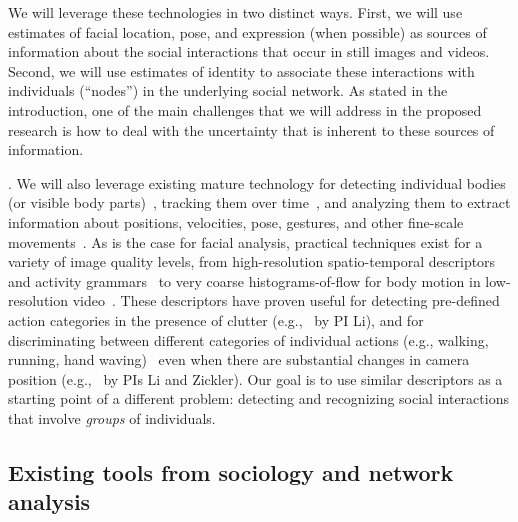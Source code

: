 We will leverage these technologies in two distinct ways. First, we will use estimates of facial location, pose, and expression (when possible) as sources of information about the social interactions that occur in still images and videos. Second, we will use estimates of identity to associate these interactions with individuals (``nodes'') in the underlying social network. As stated in the introduction, one of the main challenges that we will address  in the proposed research is how to deal with the uncertainty that is inherent to these sources of information. 

. We will also leverage existing mature technology for detecting individual bodies (or visible body parts)~\cite{Dalal:HOG}, tracking them over time~\cite{}, and analyzing them to extract information about positions, velocities, pose, gestures, and other fine-scale movements~\cite{Mitra:gesture,Ryoo:action,Poppe}. As is the case for facial analysis, practical techniques exist for a variety of image quality levels, from high-resolution spatio-temporal descriptors~\cite{Dollar:STIP,Laptev:STIP,Brox:flow} and activity grammars~\cite{Niebles2007,Niebles2006} to very coarse histograms-of-flow for body motion in low-resolution video~\cite{}. These descriptors have proven useful for detecting pre-defined action categories in the presence of clutter (e.g.,~\cite{Li2010} by PI Li), and for discriminating between different categories of individual actions (e.g., walking, running, hand waving)~\cite{} even when there are substantial changes in camera position (e.g.,~\cite{LiZickler2012} by PIs Li and Zickler). Our goal is to use similar descriptors as a starting point of a different problem: detecting and recognizing social interactions that involve \emph{groups} of individuals. 

\subsection{Existing tools from sociology and network analysis}

